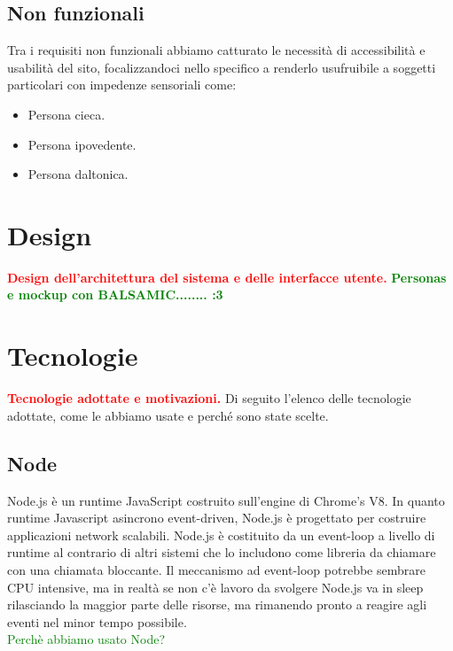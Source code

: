 \documentclass{article}
\begin{document}
\subsection{Non funzionali}
Tra i requisiti non funzionali abbiamo catturato le necessità di accessibilità e usabilità del sito, focalizzandoci nello specifico a renderlo usufruibile a soggetti particolari con impedenze sensoriali come:
\begin{itemize}
	\item Persona cieca.
	\item Persona ipovedente.
	\item Persona daltonica.
\end{itemize}

\section{Design}
\textcolor{red}{\textbf{Design dell'architettura del sistema e delle interfacce utente.}}
\textcolor{green}{\textbf{Personas e mockup con BALSAMIC........ :3}}

\section{Tecnologie}
\textcolor{red}{\textbf{Tecnologie adottate e motivazioni.}}
Di seguito l'elenco delle tecnologie adottate, come le abbiamo usate e perché sono state scelte.
\subsection{Node}
Node.js\cite{node} è un runtime JavaScript costruito sull'engine di Chrome's V8.
In quanto runtime Javascript asincrono event-driven, Node.js è progettato per costruire applicazioni network scalabili. Node.js è costituito da un event-loop a livello di runtime al contrario di altri sistemi che lo includono come libreria da chiamare con una chiamata bloccante. Il meccanismo ad event-loop potrebbe sembrare CPU intensive, ma in realtà se non c'è lavoro da svolgere Node.js va in sleep rilasciando la maggior parte delle risorse, ma rimanendo pronto a reagire agli eventi nel minor tempo possibile.
\\
\textcolor{green}{Perchè abbiamo usato Node?}
\end{document}
